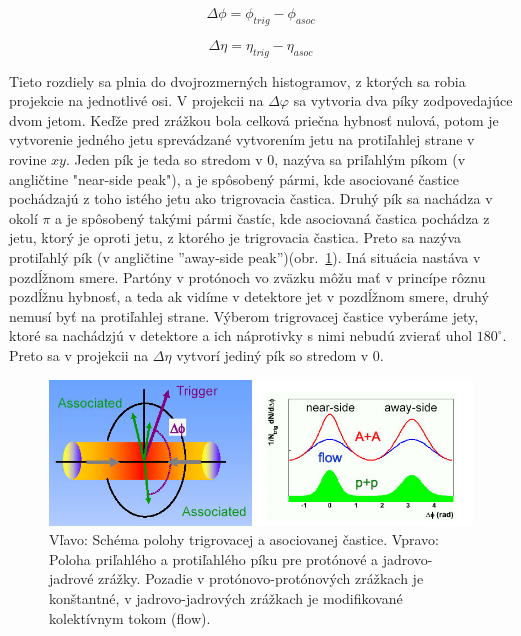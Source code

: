 \documentclass[thesismargins, thesislinespacing]{rnthesis}
\begin{document}
\begin{equation}
\Delta \phi = \phi_{trig} - \phi_{asoc}
\end{equation}

\begin{equation}
\Delta \eta = \eta_{trig} - \eta_{asoc}
\end{equation}

Tieto rozdiely sa plnia do dvojrozmerných histogramov, z ktorých sa robia projekcie na jednotlivé osi. V projekcii na $\Delta \varphi$ sa vytvoria dva píky zodpovedajúce dvom jetom. Keďže pred zrážkou bola celková priečna hybnosť nulová, potom je vytvorenie jedného jetu sprevádzané vytvorením jetu na protiľahlej strane v rovine $xy$. Jeden pík je teda so stredom v 0, nazýva sa priľahlým píkom (v angličtine "near-side peak"), a je spôsobený pármi, kde asociované častice pochádzajú z toho istého jetu ako trigrovacia častica. Druhý pík sa nachádza v okolí $\pi$ a je spôsobený takými pármi častíc, kde asociovaná častica pochádza z jetu, ktorý je oproti jetu, z ktorého je trigrovacia častica. Preto sa nazýva protiľahlý pík (v angličtine ''away-side peak'')(obr.~\ref{kor}). Iná situácia nastáva v pozdĺžnom smere. Partóny v protónoch vo zväzku môžu mať v princípe rôznu pozdĺžnu hybnosť, a teda ak vidíme v detektore jet v pozdĺžnom smere, druhý nemusí byť na protiľahlej strane. Výberom trigrovacej častice vyberáme jety, ktoré sa nachádzjú v detektore a ich náprotivky s nimi nebudú zvierať uhol $180^\circ$. Preto sa v projekcii na $\Delta \eta$ vytvorí jediný pík so stredom v 0.

\begin{figure}[hbtp!]
	\begin{center}
		\includegraphics[width=\textwidth]{./Obrazky_praca/dijetcorrelations.png}
		\caption{Vľavo: Schéma polohy trigrovacej a asociovanej častice. Vpravo: Poloha priľahlého a protiľahlého píku pre protónové a jadrovo-jadrové zrážky. Pozadie v protónovo-protónových zrážkach je konštantné, v jadrovo-jadrových zrážkach je \-mo\-di\-fi\-ko\-va\-né kolektívnym tokom (flow).}
		\label{kor}
	\end{center}
\end{figure}
\end{document}

